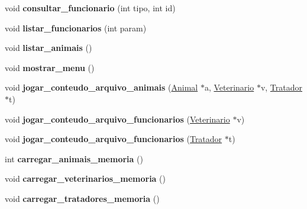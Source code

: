 \begin{DoxyCompactItemize}
\mbox{\label{classAdministrador_ae72e8ce6cb8b5629bc25e218f88f8b3d}} 
void {\bfseries consultar\+\_\+funcionario} (int tipo, int id)
\item 
\mbox{\label{classAdministrador_abbe738d4052ca599660a14b7d0cf3252}} 
void {\bfseries listar\+\_\+funcionarios} (int param)
\item 
\mbox{\label{classAdministrador_ac56f9dc0c350ea28a8815981e1542783}} 
void {\bfseries listar\+\_\+animais} ()
\item 
\mbox{\label{classAdministrador_a221e65fe7e2385e890d85b3b8d8d487d}} 
void {\bfseries mostrar\+\_\+menu} ()
\item 
\mbox{\label{classAdministrador_a9429aae0f7783ebd242cbce1fb351352}} 
void {\bfseries jogar\+\_\+conteudo\+\_\+arquivo\+\_\+animais} (\hyperlink{classAnimal}{Animal} $\ast$a, \hyperlink{classVeterinario}{Veterinario} $\ast$v, \hyperlink{classTratador}{Tratador} $\ast$t)
\item 
\mbox{\label{classAdministrador_af989cc69473e8ada31c7084867d4a8ae}} 
void {\bfseries jogar\+\_\+conteudo\+\_\+arquivo\+\_\+funcionarios} (\hyperlink{classVeterinario}{Veterinario} $\ast$v)
\item 
\mbox{\label{classAdministrador_a7cc4686e3fa70eeee48cd44232db6214}} 
void {\bfseries jogar\+\_\+conteudo\+\_\+arquivo\+\_\+funcionarios} (\hyperlink{classTratador}{Tratador} $\ast$t)
\item 
\mbox{\label{classAdministrador_acf256fa3f231a75e04cd04a3a08f1320}} 
int {\bfseries carregar\+\_\+animais\+\_\+memoria} ()
\item 
\mbox{\label{classAdministrador_a5fb3ab7407da5750117a3efe1e86dfe5}} 
void {\bfseries carregar\+\_\+veterinarios\+\_\+memoria} ()
\item 
\mbox{\label{classAdministrador_a238b2d6c98190bccdbcbfd677afa371a}} 
void {\bfseries carregar\+\_\+tratadores\+\_\+memoria} ()
\end{DoxyCompactItemize}
